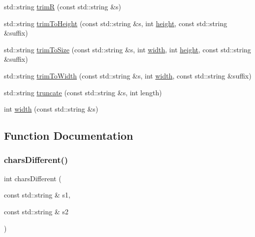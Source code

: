 \begin{DoxyCompactItemize}
\item 
std\+::string \mbox{\hyperlink{namespacestringutils_a3dc91629a4fc8f472be9bd83f6514c25}{trimR}} (const std\+::string \&s)
\item 
std\+::string \mbox{\hyperlink{namespacestringutils_a7b8e78be9a57c43689840a89be870ea7}{trim\+To\+Height}} (const std\+::string \&s, int \mbox{\hyperlink{namespacestringutils_a777c9bd90569d1f9d2dc464a69ea45bd}{height}}, const std\+::string \&suffix)
\item 
std\+::string \mbox{\hyperlink{namespacestringutils_a339e8cc8471386ba4314b587f382150d}{trim\+To\+Size}} (const std\+::string \&s, int \mbox{\hyperlink{namespacestringutils_a24e5e1105ba0113729cd02019020cae9}{width}}, int \mbox{\hyperlink{namespacestringutils_a777c9bd90569d1f9d2dc464a69ea45bd}{height}}, const std\+::string \&suffix)
\item 
std\+::string \mbox{\hyperlink{namespacestringutils_a763bfe1246c3b5e99e57aa95c7f5375e}{trim\+To\+Width}} (const std\+::string \&s, int \mbox{\hyperlink{namespacestringutils_a24e5e1105ba0113729cd02019020cae9}{width}}, const std\+::string \&suffix)
\item 
std\+::string \mbox{\hyperlink{namespacestringutils_a8ad4fa6966778fa36685ad0e5d6fbfe4}{truncate}} (const std\+::string \&s, int length)
\item 
int \mbox{\hyperlink{namespacestringutils_a24e5e1105ba0113729cd02019020cae9}{width}} (const std\+::string \&s)
\end{DoxyCompactItemize}


\subsection{Function Documentation}
\mbox{\label{namespacestringutils_a3c38f7cde8e6340eb0ff2ae3820a2806}} 
\subsubsection{\texorpdfstring{chars\+Different()}{charsDifferent()}}
{\footnotesize\ttfamily int chars\+Different (\begin{DoxyParamCaption}\item[{const std\+::string \&}]{s1,  }\item[{const std\+::string \&}]{s2 }\end{DoxyParamCaption})}

